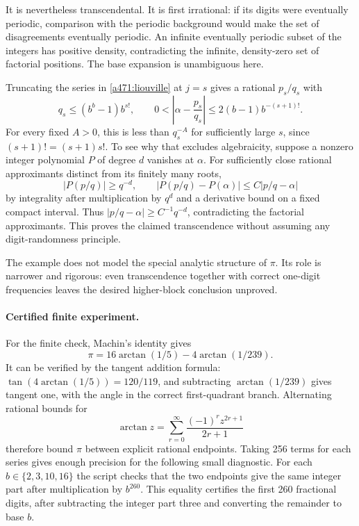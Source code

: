 \documentclass[11pt]{article}
\begin{document}
It is nevertheless transcendental. It is first irrational: if its digits were eventually periodic, comparison with the periodic background would make the set of disagreements eventually periodic. An infinite eventually periodic subset of the integers has positive density, contradicting the infinite, density-zero set of factorial positions. The base expansion is unambiguous here.

Truncating the series in \eqref{a471:liouville} at $j=s$ gives a rational $p_s/q_s$ with
\[
 q_s\leq(b^b-1)b^{s!},\qquad
 0<\left|\alpha-\frac{p_s}{q_s}\right|
       \leq2(b-1)b^{-(s+1)!}.
\]
For every fixed $A>0$, this is less than $q_s^{-A}$ for sufficiently large $s$, since $(s+1)!=(s+1)s!$. To see why that excludes algebraicity, suppose a nonzero integer polynomial $P$ of degree $d$ vanishes at $\alpha$. For sufficiently close rational approximants distinct from its finitely many roots,
\[
 |P(p/q)|\geq q^{-d},\qquad
 |P(p/q)-P(\alpha)|\leq C|p/q-\alpha|
\]
by integrality after multiplication by $q^d$ and a derivative bound on a fixed compact interval. Thus $|p/q-\alpha|\geq C^{-1}q^{-d}$, contradicting the factorial approximants. This proves the claimed transcendence without assuming any digit-randomness principle.

The example does not model the special analytic structure of $\pi$. Its role is narrower and rigorous: even transcendence together with correct one-digit frequencies leaves the desired higher-block conclusion unproved.

\paragraph{Certified finite experiment.}
For the finite check, Machin's identity gives
\[
                  \pi=16\arctan(1/5)-4\arctan(1/239).
\]
It can be verified by the tangent addition formula: $\tan(4\arctan(1/5))=120/119$, and subtracting $\arctan(1/239)$ gives tangent one, with the angle in the correct first-quadrant branch. Alternating rational bounds for
\[
                  \arctan z=\sum_{r=0}^{\infty}
                         \frac{(-1)^r z^{2r+1}}{2r+1}
\]
therefore bound $\pi$ between explicit rational endpoints. Taking 256 terms for each series gives enough precision for the following small diagnostic. For each $b\in\{2,3,10,16\}$ the script checks that the two endpoints give the same integer part after multiplication by $b^{260}$. This equality certifies the first 260 fractional digits, after subtracting the integer part three and converting the remainder to base $b$.
\end{document}
